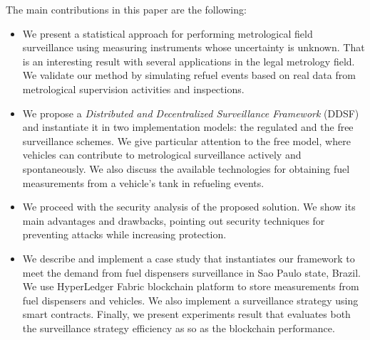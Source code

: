 \documentclass[sigplan]{acmart}
\begin{document}
The main contributions in this paper are the following:
\begin{itemize}
 \item We present a statistical approach for performing metrological field surveillance using measuring instruments whose uncertainty is unknown. That is an interesting result with several applications in the legal metrology field. We validate our method by simulating refuel events based on real data from metrological supervision activities and inspections.
 \item We propose a \textit{Distributed and Decentralized Surveillance Framework} (DDSF) and instantiate it in two implementation models: the regulated and the free surveillance schemes. We give particular attention to the free model, where vehicles can contribute to metrological surveillance actively and spontaneously. We also discuss the available technologies for obtaining fuel measurements from a vehicle's tank in refueling events.
 \item We proceed with the security analysis of the proposed solution. We show its main advantages and drawbacks, pointing out security techniques for preventing attacks while increasing protection.
 \item We describe and implement a case study that instantiates our framework to meet the demand from fuel dispensers surveillance in Sao Paulo state, Brazil. We use HyperLedger Fabric blockchain platform to store measurements from fuel dispensers and vehicles. We also implement a surveillance strategy using smart contracts.
 Finally, we present experiments result that evaluates both the surveillance strategy efficiency as so as the blockchain performance.
\end{itemize}
% 
% 
% 
% 
% 
% 
% 
\end{document}
